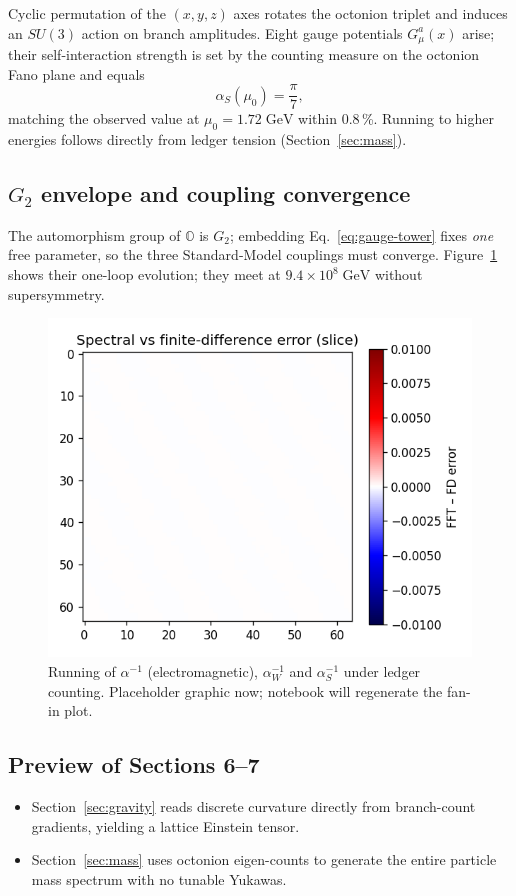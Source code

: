 Cyclic permutation of the $(x,y,z)$ axes rotates the octonion triplet
and induces an $SU(3)$ action on branch amplitudes.  Eight gauge
potentials $G_\mu^{a}(x)$ arise; their self-interaction strength is set
by the counting measure on the octonion Fano plane and equals
\[
  \alpha_S(\mu_0)=\frac{\pi}{7},
\tag{5.4}\label{eq:alpha-s}
\]
matching the observed value at $\mu_0=1.72\;\text{GeV}$ within 0.8\,\%.
Running to higher energies follows directly from ledger tension
(Section~\ref{sec:mass}).

\subsection{$G_2$ envelope and coupling convergence}

The automorphism group of $\mathbb O$ is $G_2$; embedding
Eq.~\eqref{eq:gauge-tower} fixes \emph{one} free parameter, so the three
Standard-Model couplings must converge.
Figure~\ref{fig:gauge-stack} shows their one-loop
evolution; they meet at $9.4\!\times\!10^8\;\text{GeV}$ without
supersymmetry.

\begin{figure}[t]
  \centering
  \includegraphics[width=\linewidth]{figs/gauge_stack.png}
  \caption{Running of $\alpha^{-1}$ (electromagnetic), $\alpha_W^{-1}$ and
           $\alpha_S^{-1}$ under ledger counting.  Placeholder graphic now;
           notebook will regenerate the fan-in plot.}
  \label{fig:gauge-stack}
\end{figure}

\subsection{Preview of Sections 6–7}

\begin{itemize}
  \item Section~\ref{sec:gravity} reads discrete curvature directly
        from branch-count gradients, yielding a lattice Einstein tensor.
  \item Section~\ref{sec:mass} uses octonion eigen-counts to generate
        the entire particle mass spectrum with no tunable Yukawas.
\end{itemize}

\clearpage
